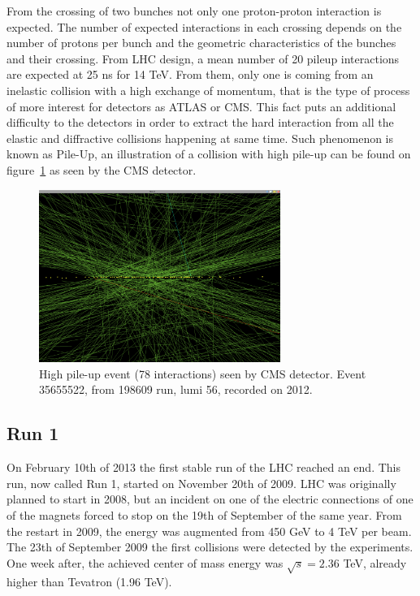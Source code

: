 From the crossing of two bunches not only one proton-proton interaction is expected. The number of expected interactions in each crossing depends on the number of protons per bunch and the geometric characteristics of the bunches and their crossing. From LHC design, a mean number of 20 pileup interactions are expected at 25 ns for 14 TeV. From them, only one is coming from an inelastic collision with a high exchange of momentum, that is the type of process of more interest for detectors as ATLAS or CMS. This fact puts an additional difficulty to the detectors in order to extract the hard interaction from all the elastic and diffractive collisions happening at same time. Such phenomenon is known as Pile-Up, an illustration of a collision with high pile-up can be found on figure~\ref{fig:pileup} as seen by the CMS detector.

\begin{figure}[!Hhtbp]
  \begin{center}
    \includegraphics[width=0.7\textwidth]{figs/pileup.png}
    \caption{High pile-up event (78 interactions) seen by CMS detector. Event 35655522, from 198609 run, lumi 56, recorded on 2012.}%
    \label{fig:pileup}
  \end{center}
\end{figure}

\subsection{Run 1}
\label{sec:run1}

On February 10th of 2013 the first stable run of the LHC reached an end. This run, now called Run 1, started on November 20th of 2009. LHC was originally planned to start in 2008, but an incident on one of the electric connections of one of the magnets forced to stop on the 19th of September of the same year. From the restart in 2009, the energy was augmented from 450 GeV to 4 TeV per beam. The 23th of September 2009 the first collisions were detected by the experiments. One week after, the achieved center of mass energy was $\sqrt{s}=2.36$ TeV, already higher than Tevatron (1.96 TeV).

